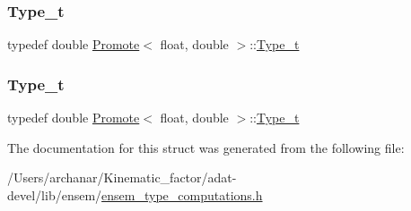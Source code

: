 \subsubsection{\texorpdfstring{Type\_t}{Type\_t}\hspace{0.1cm}{\footnotesize\ttfamily [2/3]}}
{\footnotesize\ttfamily typedef double \mbox{\hyperlink{structPromote}{Promote}}$<$ float, double $>$\+::\mbox{\hyperlink{structPromote_3_01float_00_01double_01_4_a45975d2ae1225ef4f1993d0a48b8a58e}{Type\+\_\+t}}}

\mbox{\label{structPromote_3_01float_00_01double_01_4_a45975d2ae1225ef4f1993d0a48b8a58e}} 
\subsubsection{\texorpdfstring{Type\_t}{Type\_t}\hspace{0.1cm}{\footnotesize\ttfamily [3/3]}}
{\footnotesize\ttfamily typedef double \mbox{\hyperlink{structPromote}{Promote}}$<$ float, double $>$\+::\mbox{\hyperlink{structPromote_3_01float_00_01double_01_4_a45975d2ae1225ef4f1993d0a48b8a58e}{Type\+\_\+t}}}



The documentation for this struct was generated from the following file\+:\begin{DoxyCompactItemize}
\item 
/\+Users/archanar/\+Kinematic\+\_\+factor/adat-\/devel/lib/ensem/\mbox{\hyperlink{adat-devel_2lib_2ensem_2ensem__type__computations_8h}{ensem\+\_\+type\+\_\+computations.\+h}}\end{DoxyCompactItemize}
